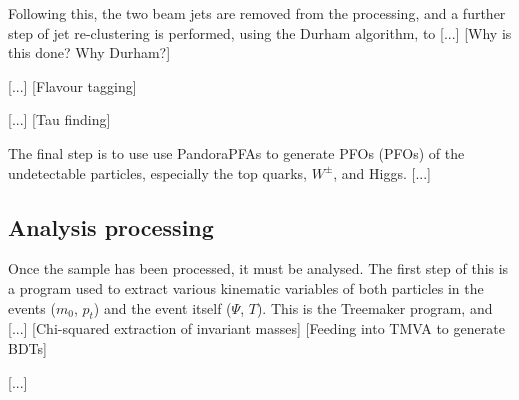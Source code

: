 Following this, the two beam jets are removed from the processing, and a further step of jet re-clustering is performed, using the Durham algorithm, to [...] [Why is this done? Why Durham?]

[...] [Flavour tagging]

[...] [Tau finding]

The final step is to use use PandoraPFAs to generate \acrlong{PFO}s (\acrshort{PFO}s) of the undetectable particles, especially the top quarks, $W^\pm$, and Higgs. [...]

\subsection{Analysis processing}
Once the sample has been processed, it must be analysed. The first step of this is a program used to extract various kinematic variables of both particles in the events ($m_0$, $p_t$) and the event itself ($\Psi$, $T$). This is the Treemaker program, and [...] [Chi-squared extraction of invariant masses] [Feeding into \acrshort{TMVA} to generate \acrshort{BDT}s]

[...]




